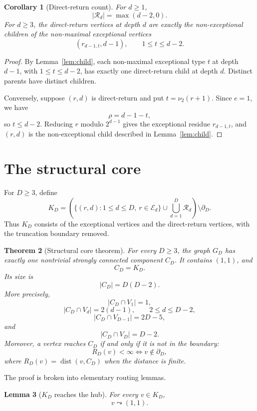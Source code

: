 \documentclass[11pt]{article}
\newtheorem{theorem}{Theorem}[section]
\newtheorem{lemma}[theorem]{Lemma}
\newtheorem{corollary}[theorem]{Corollary}
\theoremstyle{definition}
\theoremstyle{remark}
\newcommand{\nuu}{\nu_2}
\newcommand{\Ecal}{\mathcal E}
\newcommand{\Rcal}{\mathcal R}
\newcommand{\bdD}{\partial_D}
\newcommand{\dist}{\operatorname{dist}}
\begin{document}
\begin{corollary}[Direct-return count]\label{cor:direct-return-count}
For $d\ge1$,
\[
|\Rcal_d|=\max(d-2,0).
\]
For $d\ge3$, the direct-return vertices at depth $d$ are exactly the non-exceptional children of the non-maximal exceptional vertices
\[
(r_{d-1,t},d-1),
\qquad
1\le t\le d-2.
\]
\end{corollary}

\begin{proof}
By Lemma~\ref{lem:child}, each non-maximal exceptional type $t$ at depth $d-1$, with $1\le t\le d-2$, has exactly one direct-return child at depth $d$.  Distinct parents have distinct children.

Conversely, suppose $(r,d)$ is direct-return and put $t=\nuu(r+1)$.  Since $e=1$, we have
\[
\rho=d-1-t,
\]
so $t\le d-2$.  Reducing $r$ modulo $2^{d-1}$ gives the exceptional residue $r_{d-1,t}$, and $(r,d)$ is the non-exceptional child described in Lemma~\ref{lem:child}.
\end{proof}

\section{The structural core}\label{sec:core}

For $D\ge3$, define
\[
K_D=
\left(
\{(r,d):1\le d\le D,\ r\in\Ecal_d\}
\cup
\bigcup_{d=1}^D\Rcal_d
\right)
\setminus\bdD.
\]
Thus $K_D$ consists of the exceptional vertices and the direct-return vertices, with the truncation boundary removed.

\begin{theorem}[Structural core theorem]\label{thm:core}
For every $D\ge3$, the graph $G_D$ has exactly one nontrivial strongly connected component $C_D$.  It contains $(1,1)$, and
\[
C_D=K_D.
\]
Its size is
\[
|C_D|=D(D-2).
\]
More precisely,
\[
|C_D\cap V_1|=1,
\]
\[
|C_D\cap V_d|=2(d-1),\qquad 2\le d\le D-2,
\]
\[
|C_D\cap V_{D-1}|=2D-5,
\]
and
\[
|C_D\cap V_D|=D-2.
\]
Moreover, a vertex reaches $C_D$ if and only if it is not in the boundary:
\[
R_D(v)<\infty\Longleftrightarrow v\notin\bdD,
\]
where $R_D(v)=\dist(v,C_D)$ when the distance is finite.
\end{theorem}

The proof is broken into elementary routing lemmas.

\begin{lemma}[$K_D$ reaches the hub]\label{lem:k-reaches-hub}
For every $v\in K_D$,
\[
v\leadsto(1,1).
\]
\end{lemma}
\end{document}
